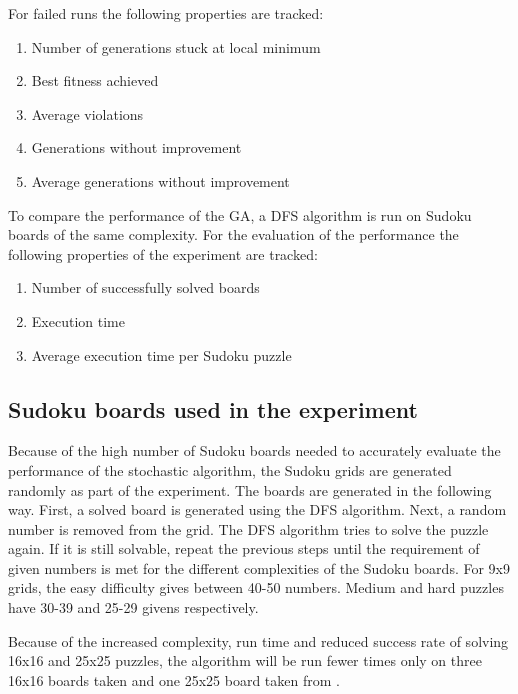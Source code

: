 For failed runs the following properties are tracked:
\begin{enumerate}
	\item Number of generations stuck at local minimum
	\item Best fitness achieved
	\item Average violations
	\item Generations without improvement
	\item Average generations without improvement
\end{enumerate}

To compare the performance of the GA, a DFS algorithm is run on Sudoku boards of the same complexity. For the evaluation of the performance the following properties of the experiment are tracked:
\begin{enumerate}
	\item Number of successfully solved boards
	\item Execution time
	\item Average execution time per Sudoku puzzle
\end{enumerate}

\subsection{Sudoku boards used in the experiment}
Because of the high number of Sudoku boards needed to accurately evaluate the performance of the stochastic algorithm, the Sudoku grids are generated randomly as part of the experiment. The boards are generated in the following way. 
First, a solved board is generated using the DFS algorithm. Next, a random number is removed from the grid. The DFS algorithm tries to solve the puzzle again. If it is still solvable, repeat the previous steps until the requirement of given numbers is met for the different complexities of the Sudoku boards. For 9x9 grids, the easy difficulty gives between 40-50 numbers. Medium and hard puzzles have 30-39 and 25-29 givens respectively.

Because of the increased complexity, run time and reduced success rate of solving 16x16 and 25x25 puzzles, the algorithm will be run fewer times only on three 16x16 boards taken and one 25x25 board taken from \cite{Sudoku16,Sudoku25}.